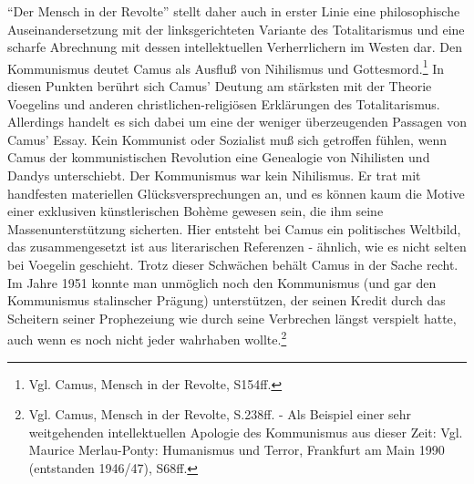 "`Der Mensch in der Revolte"' stellt daher auch in erster Linie eine
philosophische Auseinandersetzung mit der linksgerichteten Variante des
Totalitarismus und eine scharfe Abrechnung mit dessen intellektuellen
Verherrlichern im Westen dar. Den Kommunismus deutet Camus als Ausfluß
von Nihilismus und Gottesmord.\footnote{Vgl. Camus, Mensch in der
  Revolte, S154ff.} In diesen Punkten berührt sich Camus' Deutung am
stärksten mit der Theorie Voegelins und anderen christlichen-religiösen
Erklärungen des Totalitarismus. Allerdings handelt es sich dabei um eine
der weniger überzeugenden Passagen von Camus' Essay. Kein Kommunist oder
Sozialist muß sich getroffen fühlen, wenn Camus der kommunistischen
Revolution eine Genealogie von Nihilisten und Dandys unterschiebt. Der
Kommunismus war kein Nihilismus. Er trat mit handfesten materiellen
Glücksversprechungen an, und es können kaum die Motive einer exklusiven
künstlerischen Bohème gewesen sein, die ihm seine Massenunterstützung
sicherten. Hier entsteht bei Camus ein politisches Weltbild, das
zusammengesetzt ist aus literarischen Referenzen - ähnlich, wie es nicht
selten bei Voegelin geschieht. Trotz dieser Schwächen behält Camus in
der Sache recht. Im Jahre 1951 konnte man unmöglich noch den Kommunismus
(und gar den Kommunismus stalinscher Prägung) unterstützen, der seinen
Kredit durch das Scheitern seiner Prophezeiung wie durch seine
Verbrechen längst verspielt hatte, auch wenn es noch nicht jeder
wahrhaben wollte.\footnote{Vgl. Camus, Mensch in der Revolte, S.238ff. -
  Als Beispiel einer sehr weitgehenden intellektuellen Apologie des
  Kommunismus aus dieser Zeit: Vgl. Maurice Merlau-Ponty: Humanismus und
  Terror, Frankfurt am Main 1990 (entstanden 1946/47), S68ff.}

